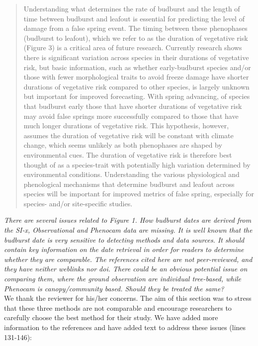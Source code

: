\documentclass[11pt,a4paper]{article}
\begin{document}
\begin{quotation}
Understanding what determines the rate of budburst and the length of time between budburst and leafout is essential for predicting the level of damage from a false spring event. The timing between these phenophases (budburst to leafout), which we refer to as the duration of vegetative risk (Figure 3) is a critical area of future research. Currently research shows there is significant variation across species in their durations of vegetative risk, but basic information, such as whether early-budburst species and/or those with fewer morphological traits to avoid freeze damage have shorter durations of vegetative risk compared to other species, is largely unknown but important for improved forecasting. With spring advancing, of species that budburst early those that have shorter durations of vegetative risk may avoid false springs more successfully compared to those that have much longer durations of vegetative risk. This hypothesis, however, assumes the duration of vegetative risk will be constant with climate change, which seems unlikely as both phenophases are shaped by environmental cues. The duration of vegetative risk is therefore best thought of as a species-trait with potentially high variation determined by environmental conditions. Understanding the various physiological and phenological mechanisms that determine budburst and leafout across species will be important for improved metrics of false spring, especially for species- and/or site-specific studies. 
\end{quotation}

\textit{There are several issues related to Figure 1. How budburst dates are derived from the SI-x, Observational and Phenocam data are missing. It is well known that the budburst date is very sensitive to detecting methods and data sources. It should contain key information on the date retrieval in order for readers to determine whether they are comparable. The references cited here are not peer-reviewed, and they have neither weblinks nor doi. There could be an obvious potential issue on comparing them, where the ground observation are individual tree-based, while Phenocam is canopy/community based. Should they be treated the same?} \\

We thank the reviewer for his/her concerns. The aim of this section was to stress that these three methods are not comparable and encourage researchers to carefully choose the best method for their study. We have added more information to the references and have added text to address these issues (lines 131-146):
\end{document}

